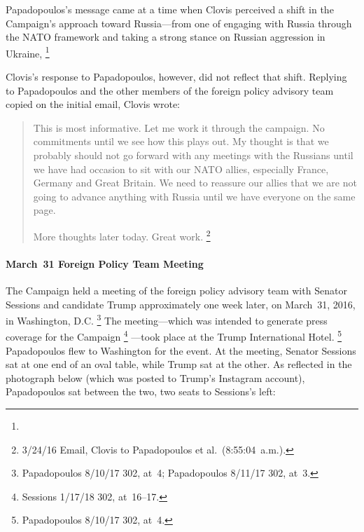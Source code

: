 Papadopoulos's message came at a time when Clovis perceived a shift in the Campaign's approach toward Russia---from one of engaging with Russia through the NATO framework and taking a strong stance on Russian aggression in Ukraine, %
\footnote{}

Clovis's response to Papadopoulos, however, did not reflect that shift.
Replying to Papadopoulos and the other members of the foreign policy advisory team copied on the initial email, Clovis wrote:

\begin{quote}
This is most informative.
Let me work it through the campaign.
No commitments until we see how this plays out.
My thought is that we probably should not go forward with any meetings with the Russians until we have had occasion to sit with our NATO allies, especially France, Germany and Great Britain.
We need to reassure our allies that we are not going to advance anything with Russia until we have everyone on the same page.

More thoughts later today.
Great work.%
\footnote{3/24/16 Email, Clovis to Papadopoulos et al.\ (8:55:04~a.m.).}
\end{quote}

\paragraph{March~31 Foreign Policy Team Meeting}

The Campaign held a meeting of the foreign policy advisory team with Senator Sessions and candidate Trump approximately one week later, on March~31, 2016, in Washington, D.C.%
\footnote{Papadopoulos 8/10/17 302, at~4; Papadopoulos 8/11/17 302, at~3.}
The meeting---which was intended to generate press coverage for the Campaign%
\footnote{Sessions 1/17/18 302, at~16--17.}%
---took place at the Trump International Hotel.%
\footnote{Papadopoulos 8/10/17 302, at~4.}
Papadopoulos flew to Washington for the event.
At the meeting, Senator Sessions sat at one end of an oval table, while Trump sat at the other.
As reflected in the photograph below (which was posted to Trump's Instagram account), Papadopoulos sat between the two, two seats to Sessions's left:

